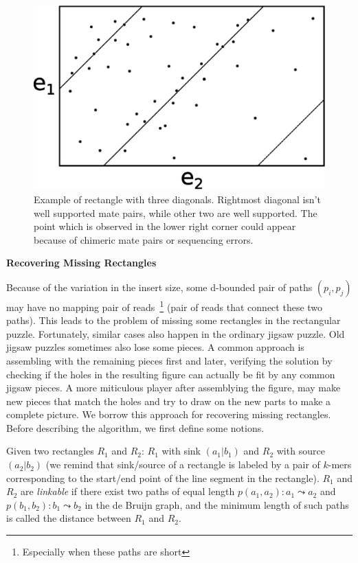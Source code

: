\documentclass[a4paper]{article}
\begin{document}
\begin{figure}
\begin{center}
\includegraphics[scale=0.5]{fig/rectangle.eps}
\caption{Example of rectangle with three diagonals. Rightmost diagonal isn't well supported mate pairs, 
while other two are well supported. The point which is observed in the lower right corner 
could appear because of chimeric mate pairs or sequencing errors.}
\end{center}
\end{figure}

\noindent
\textbf{Recovering Missing Rectangles}

Because of the variation in the insert size, some d-bounded pair of paths $(p_i,p_j)$ may have no mapping pair 
of reads~\footnote{Especially when these paths are short} (pair of reads that connect these two paths). 
This leads to the problem of missing some rectangles in the rectangular
puzzle. Fortunately, similar cases also happen in the ordinary jigsaw puzzle.
Old jigsaw puzzles sometimes also lose some pieces. A common approach is assembling with the remaining pieces first and later, verifying  
the solution by checking if the holes in the resulting figure can actually be fit by any common jigsaw pieces. A more miticulous 
player after assemblying the figure, may make new pieces that match the holes and try to draw on the new parts to make a complete picture. 
We borrow this approach for recovering missing rectangles. Before describing the algorithm, we first define some notions.

Given two rectangles $R_1$ and $R_2$: $R_1$  with sink $(a_1|b_1)$  and $R_2$ with source  $(a_2|b_2)$ (we remind 
that sink/source of a rectangle is labeled by a pair of $k$-mers corresponding to the start/end point of the line segment in the rectangle).  
$R_1$ and $R_2$ are \emph{linkable} if there exist two paths of equal length $p(a_1, a_2): a_1 \leadsto a_2$ and $p(b_1, b_2): b_1 \leadsto b_2$
in the de Bruijn graph, and the minimum length of such paths is called the distance between $R_1$ and $R_2$. 
\end{document}
